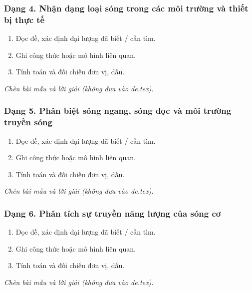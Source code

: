 \subsubsection{Dạng 4. Nhận dạng loại sóng trong các môi trường và thiết bị thực tế}
\begin{phuongphap}
\begin{enumerate}
\item Đọc đề, xác định đại lượng đã biết / cần tìm.
\item Ghi công thức hoặc mô hình liên quan.
\item Tính toán và đối chiếu đơn vị, dấu.
\end{enumerate}
\end{phuongphap}
\begin{vidumau}
\textit{Chèn bài mẫu và lời giải (không đưa vào de.tex).}
\end{vidumau}

\subsubsection{Dạng 5. Phân biệt sóng ngang, sóng dọc và môi trường truyền sóng}
\begin{phuongphap}
\begin{enumerate}
\item Đọc đề, xác định đại lượng đã biết / cần tìm.
\item Ghi công thức hoặc mô hình liên quan.
\item Tính toán và đối chiếu đơn vị, dấu.
\end{enumerate}
\end{phuongphap}
\begin{vidumau}
\textit{Chèn bài mẫu và lời giải (không đưa vào de.tex).}
\end{vidumau}

\subsubsection{Dạng 6. Phân tích sự truyền năng lượng của sóng cơ}
\begin{phuongphap}
\begin{enumerate}
\item Đọc đề, xác định đại lượng đã biết / cần tìm.
\item Ghi công thức hoặc mô hình liên quan.
\item Tính toán và đối chiếu đơn vị, dấu.
\end{enumerate}
\end{phuongphap}
\begin{vidumau}
\textit{Chèn bài mẫu và lời giải (không đưa vào de.tex).}
\end{vidumau}

